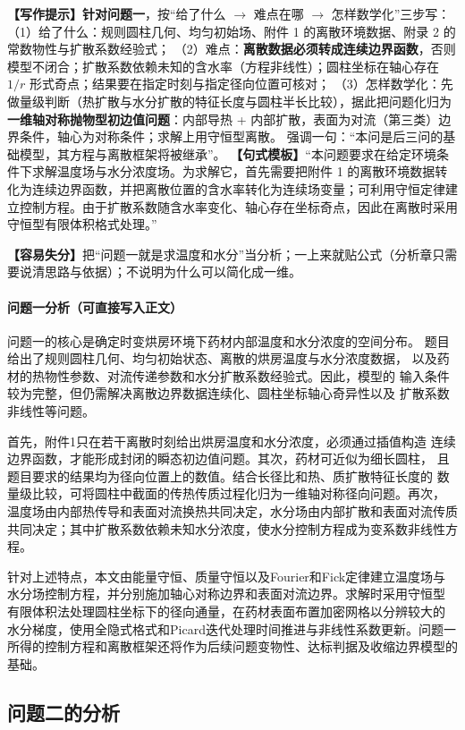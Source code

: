 \documentclass[12pt,a4paper]{article}
\newcommand{\prompt}[1]{\par\noindent\textbf{【写作提示】}#1\par}      %
\newcommand{\pitfall}[1]{\par\noindent\textbf{【容易失分】}#1\par}     %
\begin{document}
\prompt{\textbf{针对问题一}，按“给了什么 $\rightarrow$ 难点在哪 $\rightarrow$ 怎样数学化”三步写：
（1）给了什么：规则圆柱几何、均匀初始场、附件 1 的离散环境数据、附录 2 的常数物性与扩散系数经验式；
（2）难点：\textbf{离散数据必须转成连续边界函数}，否则模型不闭合；扩散系数依赖未知的含水率（方程非线性）；圆柱坐标在轴心存在 $1/r$ 形式奇点；结果要在指定时刻与指定径向位置可核对；
（3）怎样数学化：先做量级判断（热扩散与水分扩散的特征长度与圆柱半长比较），据此把问题化归为\textbf{一维轴对称抛物型初边值问题}：内部导热 + 内部扩散，表面为对流（第三类）边界条件，轴心为对称条件；求解上用守恒型离散。
强调一句：“本问是后三问的基础模型，其方程与离散框架将被继承”。
\textbf{【句式模板】}“本问题要求在给定环境条件下求解温度场与水分浓度场。为求解它，首先需要把附件 1 的离散环境数据转化为连续边界函数，并把离散位置的含水率转化为连续场变量；可利用守恒定律建立控制方程。由于扩散系数随含水率变化、轴心存在坐标奇点，因此在离散时采用守恒型有限体积格式处理。”}

\pitfall{把“问题一就是求温度和水分”当分析；一上来就贴公式（分析章只需要说清思路与依据）；不说明为什么可以简化成一维。}

\paragraph{问题一分析（可直接写入正文）}
问题一的核心是确定时变烘房环境下药材内部温度和水分浓度的空间分布。
题目给出了规则圆柱几何、均匀初始状态、离散的烘房温度与水分浓度数据，
以及药材的热物性参数、对流传递参数和水分扩散系数经验式。因此，模型的
输入条件较为完整，但仍需解决离散边界数据连续化、圆柱坐标轴心奇异性以及
扩散系数非线性等问题。

首先，附件1只在若干离散时刻给出烘房温度和水分浓度，必须通过插值构造
连续边界函数，才能形成封闭的瞬态初边值问题。其次，药材可近似为细长圆柱，
且题目要求的结果均为径向位置上的数值。结合长径比和热、质扩散特征长度的
数量级比较，可将圆柱中截面的传热传质过程化归为一维轴对称径向问题。再次，
温度场由内部热传导和表面对流换热共同决定，水分场由内部扩散和表面对流传质
共同决定；其中扩散系数依赖未知水分浓度，使水分控制方程成为变系数非线性方程。

针对上述特点，本文由能量守恒、质量守恒以及Fourier和Fick定律建立温度场与
水分场控制方程，并分别施加轴心对称边界和表面对流边界。求解时采用守恒型
有限体积法处理圆柱坐标下的径向通量，在药材表面布置加密网格以分辨较大的
水分梯度，使用全隐式格式和Picard迭代处理时间推进与非线性系数更新。问题一
所得的控制方程和离散框架还将作为后续问题变物性、达标判据及收缩边界模型的基础。

\subsection{问题二的分析}
\end{document}
